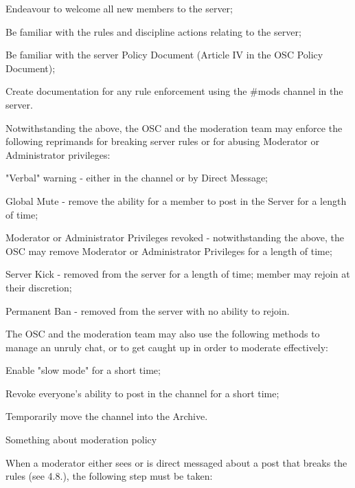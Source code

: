 \begin{longenum}[ label*=\thesubsection.\arabic*., align=left]
		\begin{longenum}[label*=\arabic*., align=left]
		\item Endeavour to welcome all new members to the server;
		\item Be familiar with the rules and discipline actions relating to the server;
		\item Be familiar with the server Policy Document (Article IV in the OSC Policy Document);
		\item Create documentation for any rule enforcement using the \#mods channel in the server.
		\end{longenum}	
	\item Notwithstanding the above, the OSC and the moderation team may enforce the following reprimands for breaking server rules or for abusing Moderator or Administrator privileges:
		\begin{longenum}[label*=\arabic*., align=left]
		\item "Verbal" warning - either in the channel or by Direct Message;
		\item Global Mute - remove the ability for a member to post in the Server for a length of time;
		\item Moderator or Administrator Privileges revoked - notwithstanding the above, the OSC may remove Moderator or Administrator Privileges for a length of time;
		\item Server Kick - removed from the server for a length of time; member may rejoin at their discretion;
		\item Permanent Ban - removed from the server with no ability to rejoin.
		\end{longenum}	
	\item The OSC and the moderation team may also use the following methods to manage an unruly chat, or to get caught up in order to moderate effectively:
		\begin{longenum}[label*=\arabic*., align=left]
		\item Enable "slow mode" for a short time;
		\item Revoke everyone's ability to post in the channel for a short time;
		\item Temporarily move the channel into the Archive.
		\end{longenum}	
	\item Something about moderation policy
		\begin{longenum}[label*=\arabic*., align=left]	
		\item When a moderator either sees or is direct messaged about a post that breaks the rules (see 4.8.), the following step must be taken:

\end{longenum}
\end{longenum}
